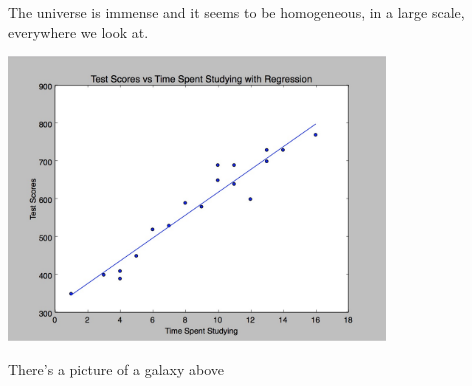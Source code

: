 \documentclass{article}
\begin{document}
The universe is immense and it seems to be homogeneous, 
in a large scale, everywhere we look at.
 
\includegraphics[width=100mm]{regression.png}
 
There's a picture of a galaxy above
\end{document}
